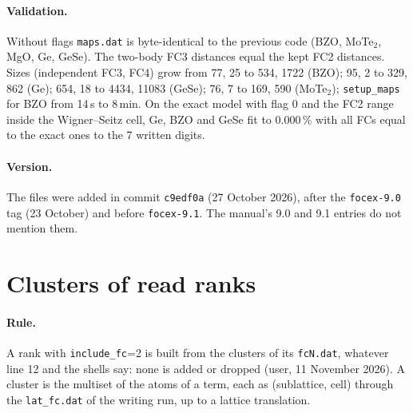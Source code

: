 \documentclass[11pt,a4paper]{article}
\newcommand{\code}[1]{\texttt{#1}}
\begin{document}
\paragraph{Validation.} Without flags \code{maps.dat} is byte-identical to the previous code (BZO,
MoTe$_2$, MgO, Ge, GeSe). The two-body FC3 distances equal the kept FC2 distances. Sizes (independent FC3,
FC4) grow from 77, 25 to 534, 1722 (BZO); 95, 2 to 329, 862 (Ge); 654, 18 to 4434, 11083 (GeSe); 76, 7 to
169, 590 (MoTe$_2$); \code{setup\_maps} for BZO from 14\,s to 8\,min. On the exact model with flag 0 and the
FC2 range inside the Wigner--Seitz cell, Ge, BZO and GeSe fit to 0.000\,\% with all FCs equal to the exact
ones to the 7 written digits.

\paragraph{Version.} The files were added in commit \code{c9edf0a} (27 October 2026), after the
\code{focex-9.0} tag (23 October) and before \code{focex-9.1}. The manual's 9.0 and 9.1 entries do not
mention them.

\section{Clusters of read ranks}\label{sec:readclusters}
\paragraph{Rule.} A rank with \code{include\_fc}=2 is built from the clusters of its \code{fcN.dat}, whatever line 12
and the shells say: none is added or dropped (user, 11 November 2026). A cluster is the multiset of the atoms of
a term, each as (sublattice, cell) through the \code{lat\_fc.dat} of the writing run, up to a lattice translation.
\end{document}
